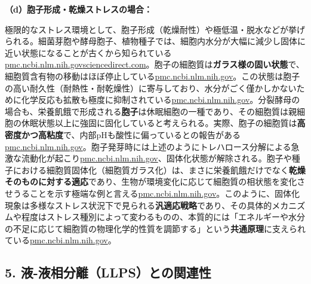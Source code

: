 \textbf{（d）胞子形成・乾燥ストレスの場合：}

 極限的なストレス環境として、胞子形成（乾燥耐性）や極低温・脱水などが挙げられる。細菌芽胞や酵母胞子、植物種子では、細胞内水分が大幅に減少し固体に近い状態になることが古くから知られている\href{https://pmc.ncbi.nlm.nih.gov/articles/PMC2780810/\#:~:text=Whether\%20glass,17}{pmc.ncbi.nlm.nih.gov}\href{https://www.sciencedirect.com/topics/agricultural-and-biological-sciences/bacterial-spore\#:~:text=However\%2C\%20according\%20to\%20the\%20second\%2C,like\%20solid}{sciencedirect.com}。胞子の細胞質は\textbf{ガラス様の固い状態}で、細胞質含有物の移動はほぼ停止している\href{https://pmc.ncbi.nlm.nih.gov/articles/PMC11214080/\#:~:text=spores\%20and\%20uncovered\%20signaling\%20pathways,such\%20as\%20ribosomes\%2C\%20is\%20restricted}{pmc.ncbi.nlm.nih.gov}。この状態は胞子の高い耐久性（耐熱性・耐乾燥性）に寄与しており、水分がごく僅かしかないために化学反応も拡散も極度に抑制されている\href{https://pmc.ncbi.nlm.nih.gov/articles/PMC2780810/\#:~:text=Whether\%20glass,17}{pmc.ncbi.nlm.nih.gov}。分裂酵母の場合も、栄養飢餓で形成される\textbf{胞子}は休眠細胞の一種であり、その細胞質は親細胞の休眠状態以上に強固に固化していると考えられる。実際、胞子の細胞質は\textbf{高密度かつ高粘度}で、内部pHも酸性に偏っているとの報告がある\href{https://pmc.ncbi.nlm.nih.gov/articles/PMC10118125/\#:~:text=Breaking\%20spore\%20dormancy\%20in\%20budding,by\%20the\%20neutralization\%20and}{pmc.ncbi.nlm.nih.gov}。胞子発芽時には上述のようにトレハロース分解による急激な流動化が起こり\href{https://pmc.ncbi.nlm.nih.gov/articles/PMC11214080/\#:~:text=cytoplasmic\%20properties,of\%20diffusion\%20coefficients\%20with\%20tracer}{pmc.ncbi.nlm.nih.gov}、固体化状態が解除される。胞子や種子における細胞質固体化（細胞質ガラス化）は、まさに栄養飢餓だけでなく\textbf{乾燥そのものに対する適応}であり、生物が環境変化に応じて細胞質の相状態を変化させうることを示す極端な例と言える\href{https://pmc.ncbi.nlm.nih.gov/articles/PMC6857596/\#:~:text=organisation,high\%20amounts\%20of\%20carbohydrates\%2C\%20possibly}{pmc.ncbi.nlm.nih.gov}。このように、固体化現象は多様なストレス状況下で見られる\textbf{汎適応戦略}であり、その具体的メカニズムや程度はストレス種別によって変わるものの、本質的には「エネルギーや水分の不足に応じて細胞質の物理化学的性質を調節する」という\textbf{共通原理}に支えられている\href{https://pmc.ncbi.nlm.nih.gov/articles/PMC6857596/\#:~:text=organisation,high\%20amounts\%20of\%20carbohydrates\%2C\%20possibly}{pmc.ncbi.nlm.nih.gov}。

\subsection{5. 液-液相分離（LLPS）との関連性}

